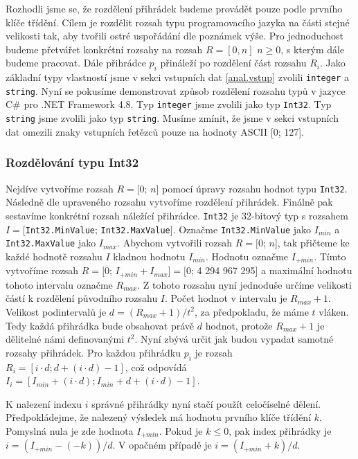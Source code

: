 Rozhodli jsme se, že rozdělení přihrádek budeme provádět pouze podle prvního klíče třídění.
Cílem je rozdělit rozsah typu programovacího jazyka na části stejné velikosti tak, aby tvořili ostré uspořádání dle poznámek výše.
Pro jednoduchost budeme přetvářet konkrétní rozsahy na rozsah $R=[0, n]$ $n \ge 0$, s kterým dále budeme pracovat.
Dále přihrádce $p_i$ přináleží po rozdělení část rozsahu $R_i$.
Jako základní typy vlastností jsme v sekci vstupních dat \ref{anal.vstup} zvolili \texttt{integer} a \texttt{string}. 
Nyní se pokusíme demonstrovat způsob rozdělení rozsahu typů v jazyce C\# pro .NET Framework 4.8.
Typ \texttt{integer} jsme zvolili jako typ \texttt{Int32}.
Typ \texttt{string} jsme zvolili jako typ \texttt{string}.
Musíme zmínit, že jsme v sekci vstupních dat omezili znaky vstupních řetězců pouze na hodnoty ASCII [0; 127]. 

\subsubsection{Rozdělování typu Int32}

Nejdíve vytvoříme rozsah $R=[$0; $n$] pomocí úpravy rozsahu hodnot typu \texttt{Int32}.
Následně dle upraveného rozsahu vytvoříme rozdělení přihrádek.
Finálně pak sestavíme konkrétní rozsah náležící přihrádce.
\texttt{Int32} je 32-bitový typ s rozsahem $I=[$\texttt{Int32.MinValue}; \texttt{Int32.MaxValue}$]$.
Označme \texttt{Int32.MinValue} jako $I_{min}$ a \texttt{Int32.MaxValue} jako $I_{max}$.
Abychom vytvořili rozsah $R=[$0; $n$], tak přičteme ke každé hodnotě rozsahu $I$ kladnou hodnotu $I_{min}$.
Hodnotu označme $I_{+min}$.
Tímto vytvoříme rozsah $R=[0$; $I_{+min}+I_{max}$$]=[0$; 4 294 967 295] a maximální hodnotu tohoto intervalu označme $R_{max}$.
Z tohoto rozsahu nyní jednoduše určíme velikosti částí k rozdělení původního rozsahu $I$.
Počet hodnot v intervalu je $R_{max}+1$.
Velikost podintervalů je $d=(R_{max}+1)/t^2$, za předpokladu, že máme $t$ vláken.
Tedy každá přihrádka bude obsahovat právě $d$ hodnot, protože $R_{max}+1$ je dělitelné námi definovanými $t^2$.
Nyní zbývá určit jak budou vypadat samotné rozsahy přihrádek.
Pro každou přihrádku $p_i$ je rozsah $R_i=[i \cdot d; d+(i \cdot d)-1]$, což odpovídá $I_i=[I_{min}+(i \cdot d); I_{min}+d+(i \cdot d)-1]$.

K nalezení indexu $i$ správné přihrádky nyní stačí použít celočíselné dělení.
Předpokládejme, že nalezený výsledek má hodnotu prvního klíče třídění $k$.
Pomyslná nula je zde hodnota $I_{+min}$.
Pokud je $k \leq 0$, pak index přihrádky je $i=(I_{+min}-(-k))/d$.
V opačném případě je $i=(I_{+min}+k)/d$.

